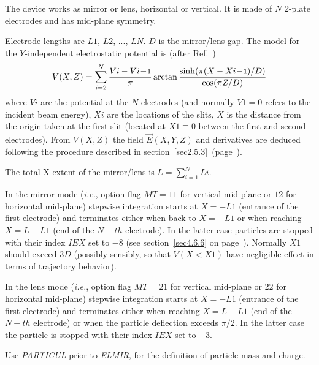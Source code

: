 The device works as  mirror or lens, horizontal or vertical. 
It is made of $N$ 2-plate electrodes and has mid-plane symmetry.  
\bigskip

\noindent Electrode lengths are  $ L\!1 $, $ L\!2 $, ...,   $ L\!N$. $D$ is the  mirror/lens gap. 
The model for the $Y$-independent electrostatic potential is (after Ref.~\cite[p.412]{Karets}) 
$$ V(X,Z) = 
   \sum_{i=2}^{N} \dfrac{V{i}-V{i\!-\!\textrm{\footnotesize 1}} }{ \pi} 
     \arctan\dfrac{\sinh(\pi ( X - X{i\!-\!\textrm{\footnotesize 1}})/D)}{\cos(\pi Z/D)}   
$$
where $V\!i$ are the potential at the $N$ electrodes (and normally $V\!1=0$ refers to 
the incident beam energy),   $X\!i$ are the  locations of the slits, $ X $ is the distance 
from the origin taken at the first slit (located at $X\!1 \equiv 0$ between the first and 
second electrodes).  
 From $V(X,Z) $ the field $ \vec  E(X,Y,Z) $ and derivatives are deduced following the procedure 
described in section~\ref{sec2.5.3}~(page~\pageref{sec2.5.3}).  

\noindent The total X-extent of the mirror/lens is $L = \sum_{i=1}^N L\!i$.

\noindent In the mirror mode ({\it i.e.}, option flag $MT=11$ for vertical mid-plane  or $12$ 
for horizontal mid-plane) stepwise integration starts 
at $X=-L\!1$ (entrance of the first electrode) and terminates either when back to   $X=-L\!1$  
or when  reaching $ X=L-L\!1$ (end of the $N-th$ electrode). 
In the latter case particles  are stopped  with their index
 $I\!E\!X$ set to $-8$ (see section~\ref{sec4.6.6} on page~\pageref{sec4.6.6}). 
Normally $X\!1$ should   exceed  $3D$ (possibly sensibly, 
so that $V(X<X\!1)$   have negligible effect in terms of trajectory behavior).  

\noindent In the lens mode ({\it i.e.}, option flag $MT=21$ for vertical mid-plane  or $22$
for horizontal mid-plane) stepwise integration starts
at $X=-L\!1$ (entrance of the first electrode) and terminates either when reaching $ X=L-L\!1$ (end of the $N-th$ electrode) 
or when the particle deflection exceeds $\pi/2$. In the latter case the particle is stopped  with their index
 $I\!E\!X$ set to $-3$. 
 
\bigskip

\noindent Use \textsl{PARTICUL} prior to \textsl{ELMIR}, for the
 definition of particle mass and charge.

\bigskip
\vfill


